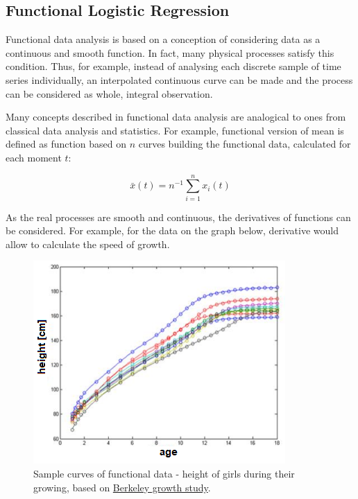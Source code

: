 \documentclass[energies,article,submit,pdftex,moreauthors]{Definitions/mdpi}
\begin{document}
\subsection{Functional Logistic Regression}

Functional data analysis is based on a conception of considering data as a continuous and smooth function. In fact, many physical processes satisfy this condition. Thus, for example, instead of analysing each discrete sample of time series individually, an interpolated continuous curve can be made and the process can be considered as whole, integral observation.

Many concepts described in functional data analysis are analogical to ones from classical data analysis and statistics. For example, functional version of mean is defined as function based on $ n $ curves building the functional data, calculated for each moment $ t $:
\begin{linenomath}
\begin{equation}
\bar{x}(t) = n^{-1} \sum_{i=1}^{n} x_i (t)
\end{equation}
\end{linenomath}

As the real processes are smooth and continuous, the derivatives of functions can be considered. For example, for the data on the graph below, derivative would allow to calculate the speed of growth.
\begin{figure}[H]
\includegraphics[width=10.5 cm]{images/berkeley}
\caption{Sample curves of functional data - height of girls during their growing, based on \href{https://www.jstor.org/stable/1125347}{Berkeley growth study}.}
\end{figure}
\unskip
\end{document}
